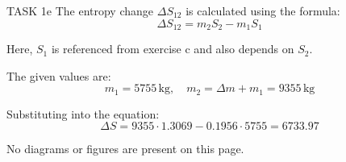 TASK 1e  
The entropy change \( \Delta S_{12} \) is calculated using the formula:  
\[
\Delta S_{12} = m_2 S_2 - m_1 S_1
\]  

Here, \( S_1 \) is referenced from exercise c and also depends on \( S_2 \).  

The given values are:  
\[
m_1 = 5755 \, \text{kg}, \quad m_2 = \Delta m + m_1 = 9355 \, \text{kg}
\]  

Substituting into the equation:  
\[
\Delta S = 9355 \cdot 1.3069 - 0.1956 \cdot 5755 = 6733.97
\]  

No diagrams or figures are present on this page.